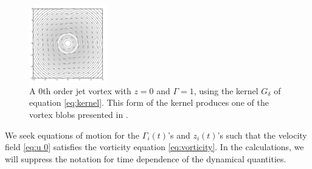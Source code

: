 \documentclass[12pt]{amsart}
\theoremstyle{remark}
\begin{document}
\begin{figure}[h] %
   \centering
   \includegraphics[clip,trim=0.6in 0.5in 0.6in 0.6in,width=0.3\textwidth]{./images/zero.pdf} 
   \caption{A 0th order jet vortex with $z = 0$ and $\Gamma=1$, using the kernel $G_\delta$ of equation \eqref{eq:kernel}. This form of the kernel produces one of the vortex blobs presented in \cite{BealeMajda1985}.}
   \label{fig:zero}
\end{figure}

We seek equations of motion for the $\Gamma_i(t)$'s and $z_i(t)$'s
such that the velocity field \eqref{eq:u 0} satisfies the vorticity equation \eqref{eq:vorticity}.
In the calculations, we will suppress the notation for time dependence of the dynamical quantities.
\end{document}
